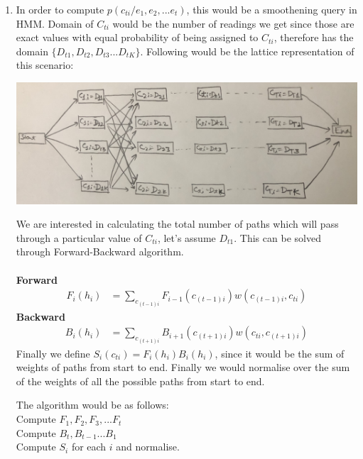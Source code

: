 \documentclass[12pt]{article}
\begin{document}
\begin{enumerate}[label=(\alph*)]
 \item In order to compute $p(c_{ti}/e_1, e_2, ... e_t)$, this would be a smoothening query in HMM. Domain of $C_{ti}$ would be the number of readings we get since those are exact values with equal probability of being assigned to $C_{ti}$, therefore has the domain $\{D_{t1}, D_{t2}, D_{t3} ... D_{tK}\}$. Following would be the lattice representation of this scenario:
   \begin{center}
  \includegraphics[scale=0.1]{IMG_2299}
  \end{center}
  We are interested in calculating the total number of paths which will pass through a particular value of $C_{ti}$, let's assume $D_{t1}$. This can be solved through Forward-Backward algorithm. \\ \\
  \textbf{Forward}
  \begin{align*}
  F_i(h_i) &= \sum_{c_{(t-1)i}} F_{i-1}(c_{(t-1)i}) w(c_{(t-1)i}, c_{ti})
  \end{align*}
  \textbf{Backward}
  \begin{align*}
  B_i(h_i) &= \sum_{c_{(t+1)i}} B_{i+1}(c_{(t+1)i}) w(c_{ti}, c_{(t+1)i})
  \end{align*}
  Finally we define $S_{i}(c_{ti}) = F_i(h_i) B_i(h_i)$, since it would be the sum of weights of paths from start to end. Finally we would normalise over the sum of the weights of all the possible paths from start to end.
  
  The algorithm would be as follows: \\
  Compute $F_1, F_2, F_3, ... F_t$ \\
  Compute $B_t, B_{t-1} ... B_{1}$ \\
  Compute $S_i$ for each $i$ and normalise.
 
\end{enumerate}
\end{document}

